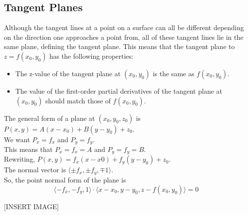 \subsection{Tangent Planes}
\noindent
Although the tangent lines at a point on a surface can all be different depending on the direction one approaches a point from, all of these tangent lines lie in the same plane, defining the tangent plane. This means that the tangent plane to $z = f(x_0, y_0)$ has the following properties:
\begin{itemize}
	\item The z-value of the tangent plane at $(x_0, y_0)$ is the same as $f(x_0, y_0)$.
	\item The value of the first-order partial derivatives of the tangent plane at $(x_0, y_0)$ should match those of $f(x_0, y_0)$.
\end{itemize}

\noindent
The general form of a plane at $(x_0, y_0, z_0)$ is $P(x,y) = A(x-x_0) + B(y-y_0) + z_0$.\\ 
We want $P_x = f_x$ and $P_y = f_y$.\\
This means that $P_x = f_x = A$ and $P_y = f_y = B$.\\
Rewriting, $P(x,y) = f_x(x-x0) + f_y(y-y_0) + z_0$.\\
The normal vector is $\langle \pm f_x,\pm f_y, \mp 1\rangle$.\\
So, the point normal form of the plane is 
\begin{equation*}
	\langle -f_x, -f_y, 1\rangle \cdot \langle x-x_0, y-y_0, z-f(x_0,y_0) \rangle = 0
\end{equation*}

[INSERT IMAGE]

